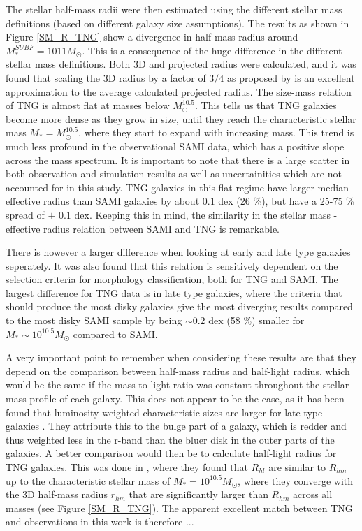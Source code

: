 The stellar half-mass radii were then estimated using the different stellar mass definitions (based on different galaxy size assumptions). The results as shown in Figure \ref{SM_R_TNG} show a divergence in half-mass radius around $M^{SUBF}_\ast = 10{11} M_\odot$. This is a consequence of the huge difference in the different stellar mass definitions. Both 3D and projected radius were calculated, and it was found that scaling the 3D radius by a factor of $3/4$ as proposed by \textcite{Wolf2010} is an excellent approximation to the average calculated projected radius. 
The size-mass relation of TNG is almost flat at masses below $M^{10.5}_{\odot}$. This tells us that TNG galaxies become more dense as they grow in size, until they reach the characteristic stellar mass $M_\ast = M^{10.5}_{\odot}$, where they start to expand with increasing mass. This trend is much less profound in the observational SAMI data, which has a positive slope across the mass spectrum. It is important to note that there is a large scatter in both observation and simulation results as well as uncertainities which are not accounted for in this study. TNG galaxies in this flat regime have larger median effective radius than SAMI galaxies by about 0.1 dex (26 \%), but have a 25-75 \% spread of $\pm$ 0.1 dex. Keeping this in mind, the similarity in the stellar mass - effective radius relation between SAMI and TNG is remarkable. 

There is however a larger difference when looking at early and late type galaxies seperately. It was also found that this relation is sensitively dependent on the selection criteria for morphology classification, both for TNG and SAMI. The largest difference for TNG data is in late type galaxies, where the criteria that should produce the most disky galaxies give the most diverging results compared to the most disky SAMI sample by being $\sim 0.2$ dex (58 \%) smaller for $M_\ast \sim 10^{10.5} M_\odot$ compared to SAMI.

A very important point to remember when considering these results are that they depend on the comparison between half-mass radius and half-light radius, which would be the same if the mass-to-light ratio was constant throughout the stellar mass profile of each galaxy. This does not appear to be the case, as it has been found that luminosity-weighted characteristic sizes are larger for late type galaxies \parencite{Sande2018}. They attribute this to the bulge part of a galaxy, which is redder and thus weighted less in the r-band than the bluer disk in the outer parts of the galaxies. A better comparison would then be to calculate half-light radius for TNG galaxies. This was done in \textcite{Genel2017}, where they found that $R_{hl}$ are similar to $R_{hm}$ up to the characteristic stellar mass of $M_\ast = 10^{10.5} M_\odot$, where they converge with the 3D half-mass radius $r_{hm}$ that are significantly larger than $R_{hm}$ across all masses (see Figure \ref{SM_R_TNG}). The apparent excellent match between TNG and observations in this work is therefore ...


